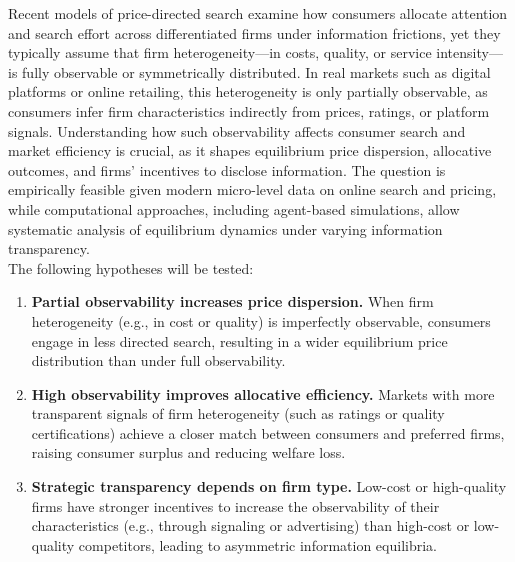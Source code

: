 \documentclass{nfr}
\begin{document}
Recent models of price-directed search \citep{obradovits2023price} examine how consumers allocate attention and search effort across differentiated firms under information frictions, yet they typically assume that firm heterogeneity---in costs, quality, or service intensity---is fully observable or symmetrically distributed. In real markets such as digital platforms or online retailing, this heterogeneity is only partially observable, as consumers infer firm characteristics indirectly from prices, ratings, or platform signals. Understanding how such observability affects consumer search and market efficiency is crucial, as it shapes equilibrium price dispersion, allocative outcomes, and firms’ incentives to disclose information. The question is empirically feasible given modern micro-level data on online search and pricing, while computational approaches, including agent-based simulations, allow systematic analysis of equilibrium dynamics under varying information transparency. \\


The following hypotheses will be tested:

\begin{enumerate}%
    \item \textbf{Partial observability increases price dispersion.} When firm heterogeneity (e.g., in cost or quality) is imperfectly observable, consumers engage in less directed search, resulting in a wider equilibrium price distribution than under full observability.
    
    \item \textbf{High observability improves allocative efficiency.} Markets with more transparent signals of firm heterogeneity (such as ratings or quality certifications) achieve a closer match between consumers and preferred firms, raising consumer surplus and reducing welfare loss.
    
    \item \textbf{Strategic transparency depends on firm type.} Low-cost or high-quality firms have stronger incentives to increase the observability of their characteristics (e.g., through signaling or advertising) than high-cost or low-quality competitors, leading to asymmetric information equilibria.
\end{enumerate}
\end{document}
